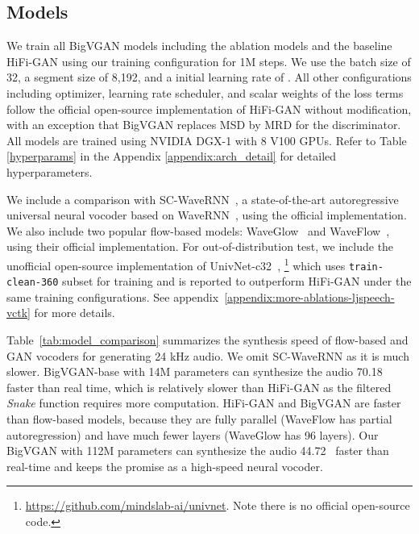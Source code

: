 \documentclass{article} \usepackage{iclr2023_conference,times}
\theoremstyle{plain}
\theoremstyle{definition}
\theoremstyle{remark}
\begin{document}
\vspace{-.2cm}
\subsection{Models}
\vspace{-.1cm}
We train all BigVGAN models including the ablation models and the baseline HiFi-GAN using our training configuration for 1M steps. We use the batch size of 32, a segment size of 8,192, and a initial learning rate of . All other configurations including optimizer, learning rate scheduler, and scalar weights of the loss terms follow the official open-source implementation of HiFi-GAN \citep{kong2020hifi} without modification, with an exception that BigVGAN replaces MSD by MRD for the discriminator. All models are trained using NVIDIA DGX-1 with 8 V100 GPUs. Refer to Table \ref{hyperparams} in the Appendix \ref{appendix:arch_detail} for detailed hyperparameters.

{We include a comparison with SC-WaveRNN~\citep{paul2020speaker}, a state-of-the-art autoregressive universal neural vocoder based on WaveRNN~\citep{kalchbrenner2018efficient}, using the official implementation. We also include two popular flow-based models: WaveGlow~\citep{prenger2019waveglow} and WaveFlow~\citep{ping2019waveflow}, using their official implementation. 
For out-of-distribution test, we include the unofficial open-source implementation of UnivNet-c32~\citep{jang2021univnet}, \footnote{\url{https://github.com/mindslab-ai/univnet}. Note there is no official open-source code.}  which uses \texttt{train-clean-360} subset for training and is reported to outperform HiFi-GAN under the same training configurations. See appendix~\ref{appendix:more-ablations-ljspeech-vctk} for more details.}


Table~\ref{tab:model_comparison} summarizes the synthesis speed of flow-based and GAN vocoders for generating 24 kHz audio. We omit SC-WaveRNN as it is much slower. 
BigVGAN-base with 14M parameters can synthesize the audio 70.18 faster than real time, which is relatively slower than HiFi-GAN as the filtered \emph{Snake} function requires more computation.
HiFi-GAN and BigVGAN are faster than flow-based models, because they are fully parallel (WaveFlow has partial autoregression) and have much fewer layers (WaveGlow has 96 layers).
Our BigVGAN with 112M parameters can synthesize the audio 44.72~ faster than real-time and keeps the promise as a high-speed neural vocoder.


\vspace{-.2cm}
\end{document}
